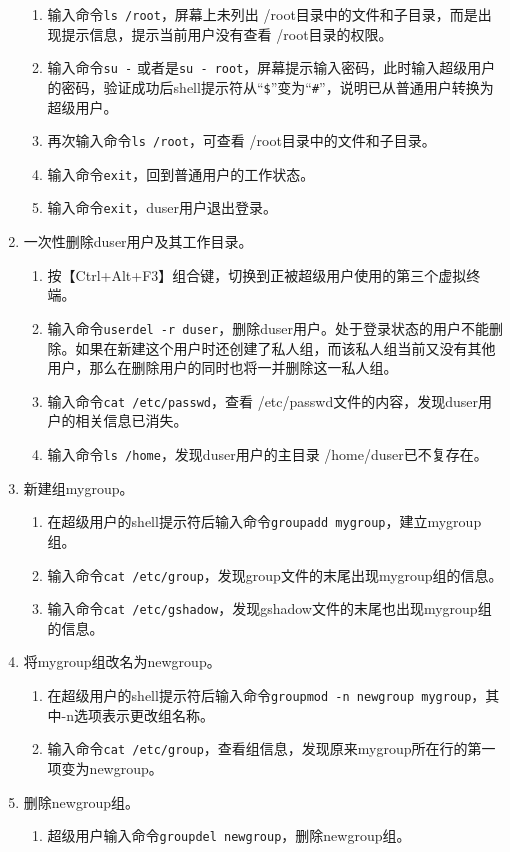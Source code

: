 \begin{enumerate}
\begin{enumerate}
      \item 输入命令\verb|ls /root|，屏幕上未列出 /root目录中的文件和子目录，而是出现提示信息，提示当前用户没有查看 /root目录的权限。
      \item 输入命令\verb|su -| 或者是\verb|su - root|，屏幕提示输入密码，此时输入超级用户的密码，验证成功后shell提示符从“\verb|$|”变为“\verb|#|”，说明已从普通用户转换为超级用户。
      \item 再次输入命令\verb|ls /root|，可查看 /root目录中的文件和子目录。
      \item 输入命令\verb|exit|，回到普通用户的工作状态。
      \item 输入命令\verb|exit|，duser用户退出登录。
    \end{enumerate}
  \item 一次性删除duser用户及其工作目录。
    \begin{enumerate}
      \item 按【Ctrl+Alt+F3】组合键，切换到正被超级用户使用的第三个虚拟终端。
      \item 输入命令\verb|userdel -r duser|，删除duser用户。处于登录状态的用户不能删除。如果在新建这个用户时还创建了私人组，而该私人组当前又没有其他用户，那么在删除用户的同时也将一并删除这一私人组。
      \item 输入命令\verb|cat /etc/passwd|，查看 /etc/passwd文件的内容，发现duser用户的相关信息已消失。
      \item 输入命令\verb|ls /home|，发现duser用户的主目录 /home/duser已不复存在。
    \end{enumerate}
  \item 新建组mygroup。
    \begin{enumerate}
      \item 在超级用户的shell提示符后输入命令\verb|groupadd mygroup|，建立mygroup组。
      \item 输入命令\verb|cat /etc/group|，发现group文件的末尾出现mygroup组的信息。
      \item 输入命令\verb|cat /etc/gshadow|，发现gshadow文件的末尾也出现mygroup组的信息。
    \end{enumerate}
  \item 将mygroup组改名为newgroup。
    \begin{enumerate}
      \item 在超级用户的shell提示符后输入命令\verb|groupmod -n newgroup mygroup|，其中-n选项表示更改组名称。
      \item 输入命令\verb|cat /etc/group|，查看组信息，发现原来mygroup所在行的第一项变为newgroup。
    \end{enumerate}
  \item 删除newgroup组。
    \begin{enumerate}
      \item 超级用户输入命令\verb|groupdel newgroup|，删除newgroup组。
    \end{enumerate}
\end{enumerate}

